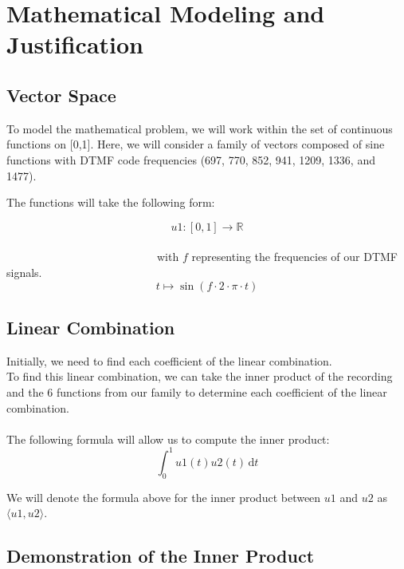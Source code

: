 \section{Mathematical Modeling and Justification}

\subsection{Vector Space}
To model the mathematical problem, we will work within the set of continuous functions on [0,1]. Here, we will consider a family of vectors composed of sine functions with DTMF code frequencies (697, 770, 852, 941, 1209, 1336, and 1477). 

The functions will take the following form:

$$u1 : [0,1] \rightarrow \mathbb{R}$$
~~~~~~~~~~~~~~~~~~~~~~~~~~~~~~~~~~~~~~~~~~~~~~~~~~~~~~~~~~~~~~~~~~~~~~~~~~~~~~~~~~~~~~~~~~~~~~~~~~~with \( f \) representing the frequencies of our DTMF signals.
$$t \mapsto \sin(f \cdot 2 \cdot \pi \cdot t)$$ 

\subsection{Linear Combination}
Initially, we need to find each coefficient of the linear combination.
\\
To find this linear combination, we can take the inner product of the recording and the 6 functions from our family to determine each coefficient of the linear combination.
\\
\\
The following formula will allow us to compute the inner product:
\[ \int_{0}^{1} u1(t)u2(t) \, \mathrm{d}t\]

We will denote the formula above for the inner product between \( u1 \) and \( u2 \) as \( \langle u1, u2 \rangle \).

\subsection{Demonstration of the Inner Product}

